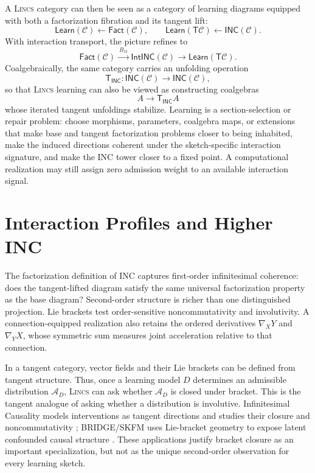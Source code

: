 \documentclass{article}
\newcommand{\C}{\mathcal{C}}
\newcommand{\T}{\mathsf{T}}
\newcommand{\INC}{\mathsf{INC}}
\begin{document}
A \textsc{Lincs}   category can then be seen as a category of learning diagrams equipped with both a factorization fibration and its tangent lift:
\[
\mathsf{Learn}(\C)
\leftarrow
\mathsf{Fact}(\C),
\qquad
\mathsf{Learn}(\T\C)
\leftarrow
\mathsf{INC}(\C).
\]
With interaction transport, the picture refines to
\[
\mathsf{Fact}(\C)
\xrightarrow{\ B_\Omega\ }
\mathsf{IntINC}(\C)
\to
\mathsf{Learn}(\T\C).
\]
Coalgebraically, the same category carries an unfolding operation
\[
\T_{\INC}:\mathsf{INC}(\C)\to\mathsf{INC}(\C),
\]
so that \textsc{Lincs}   learning can also be viewed as constructing coalgebras
\[
A\to\T_{\INC}A
\]
whose iterated tangent unfoldings stabilize. Learning is a section-selection or repair problem: choose morphisms, parameters, coalgebra maps, or extensions that make base and tangent factorization problems closer to being inhabited, make the induced directions coherent under the sketch-specific interaction signature, and make the INC tower closer to a fixed point.  A computational realization may still assign zero admission weight to an available interaction signal.


\section{Interaction Profiles and Higher INC}

The factorization definition of INC captures first-order infinitesimal
coherence: does the tangent-lifted diagram satisfy the same universal
factorization property as the base diagram?  Second-order structure is richer
than one distinguished projection.  Lie brackets test order-sensitive
noncommutativity and involutivity.  A connection-equipped realization also
retains the ordered derivatives $\nabla_XY$ and $\nabla_YX$, whose symmetric
sum measures joint acceleration relative to that connection.

In a tangent category, vector fields and their Lie brackets can be defined from
tangent structure. Thus, once a learning model $D$ determines an admissible
distribution $\mathcal A_D$, \textsc{Lincs} can ask whether $\mathcal A_D$ is
closed under bracket. This is the tangent analogue of asking whether a
distribution is involutive.  Infinitesimal Causality models interventions as
tangent directions and studies their closure and noncommutativity
\citep{mahadevan2026infinitesimal}; BRIDGE/SKFM uses Lie-bracket geometry to
expose latent confounded causal structure \citep{mahadevan2026bridge}.  These
applications justify bracket closure as an important specialization, but not
as the unique second-order observation for every learning sketch.
\end{document}
